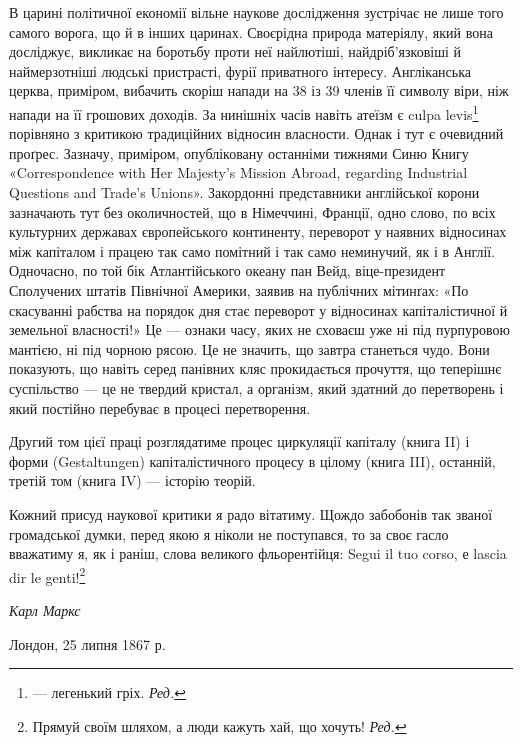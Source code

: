 В царині політичної економії вільне наукове дослідження
зустрічає не лише того самого ворога, що й в інших царинах.
Своєрідна природа матеріялу, який вона досліджує, викликає на
боротьбу проти неї найлютіші, найдріб’язковіші й наймерзотніші
людські пристрасті, фурії приватного інтересу. Англіканська
церква, приміром, вибачить скоріш напади на 38 із 39 членів
її символу віри, ніж напади на  її грошових доходів. За нинішніх
часів навіть атеїзм є culpa levis\footnote*{
— легенький гріх. \emph{Ред.}
} порівняно з критикою
традиційних відносин власности. Однак і тут є очевидний проґрес.
Зазначу, приміром, опубліковану останніми тижнями Синю
Книгу «Correspondence with Her Majesty’s Mission Abroad, regarding
Industrial Questions and Trade’s Unions». Закордонні
представники англійської корони зазначають тут без околичностей,
що в Німеччині, Франції, одно слово, по всіх культурних
державах європейського континенту, переворот у наявних відносинах
між капіталом і працею так само помітний і так само неминучий,
як і в Англії. Одночасно, по той бік Атлантійського океану
пан Вейд, віце-президент Сполучених штатів Північної Америки,
заявив на публічних мітинґах: «По скасуванні рабства
на порядок дня стає переворот у відносинах капіталістичної й
земельної власності!» Це — ознаки часу, яких не сховаєш уже
ні під пурпуровою мантією, ні під чорною рясою. Це не значить,
що завтра станеться чудо. Вони показують, що навіть серед панівних
кляс прокидається прочуття, що теперішнє суспільство —
це не твердий кристал, а організм, який здатний до перетворень
і який постійно перебуває в процесі перетворення.

Другий том цієї праці розглядатиме процес циркуляції капіталу
(книга II) і форми (Gestaltungen) капіталістичного процесу
в цілому (книга III), останній, третій том (книга IV) — історію
теорій.

Кожний присуд наукової критики я радо вітатиму. Щождо
забобонів так званої громадської думки, перед якою я ніколи не
поступався, то за своє гасло вважатиму я, як і раніш, слова великого
фльорентійця: Segui il tuo corso, е lascia dir le genti!\footnote*{
Прямуй своїм шляхом, а люди кажуть хай, що хочуть! \emph{Ред.}
}

\begin{flushright}
  \emph{Карл Маркс}
\end{flushright}

Лондон, 25 липня 1867 р.
